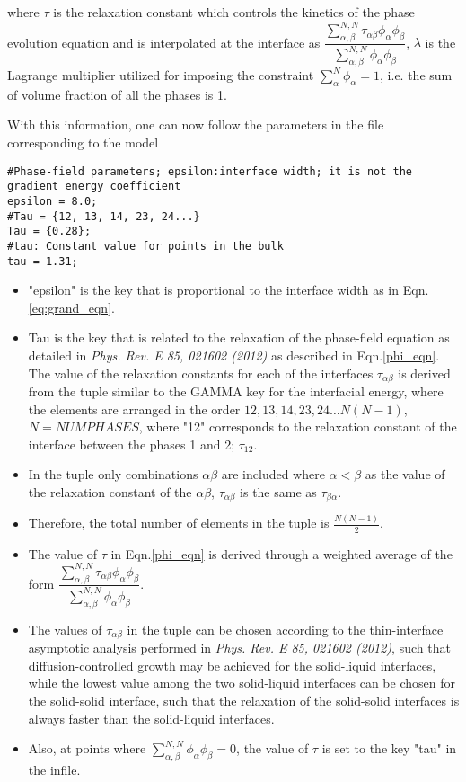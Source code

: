\documentclass[a4paper,10pt]{article}
\begin{document}
where $\tau$ is the relaxation constant which controls the kinetics of the phase 
evolution equation and is interpolated at the interface as $\dfrac{\sum_{\alpha,\beta}^{N,N}\tau_{\alpha\beta}\phi_\alpha\phi_\beta}{\sum_{\alpha,\beta}^{N,N}\phi_\alpha\phi_\beta}$,
$\lambda$ is the Lagrange multiplier 
utilized for imposing the constraint $\sum_{\alpha}^{N} \phi_\alpha = 1$, i.e. the sum of volume fraction of all the phases is 1.


With this information, one can now follow the parameters in the file corresponding to the model

\begin{lstlisting}
#Phase-field parameters; epsilon:interface width; it is not the gradient energy coefficient
epsilon = 8.0;
#Tau = {12, 13, 14, 23, 24...}
Tau = {0.28};
#tau: Constant value for points in the bulk
tau = 1.31;
\end{lstlisting}

\begin{itemize}
 \item "epsilon" is the key that is proportional to the interface width as in Eqn.\ref{eq:grand_eqn}.
 \item Tau is the key that is related to the relaxation of the phase-field equation as detailed in \textit{Phys. Rev. E 85, 021602 (2012)}
 as described in Eqn.\ref{phi_eqn}. The value of the relaxation constants for each of the interfaces $\tau_{\alpha\beta}$ is derived from the 
 tuple similar to the GAMMA key for the interfacial energy, where the elements are arranged in the order ${12,13,14,23,24 \ldots N(N-1)}$, $N=NUMPHASES$,
 where "12" corresponds to the relaxation constant of the interface between the phases 1 and 2; $\tau_{12}$.
 \item In the tuple only combinations $\alpha\beta$ are included where $\alpha<\beta$ as the value of the relaxation constant of the $\alpha\beta$, $\tau_{\alpha\beta}$ 
 is the same as $\tau_{\beta\alpha}$.
 \item Therefore, the total number of elements in the tuple is $\frac{N(N-1)}{2}$.
 \item The value of $\tau$ in Eqn.\ref{phi_eqn} is derived through a weighted average of the form 
 $\dfrac{\sum_{\alpha,\beta}^{N,N}\tau_{\alpha\beta}\phi_\alpha\phi_\beta}{\sum_{\alpha,\beta}^{N,N}\phi_\alpha\phi_\beta}$.
 \item The values of $\tau_{\alpha\beta}$ in the tuple can be chosen according to the thin-interface asymptotic analysis 
performed in \textit{Phys. Rev. E 85, 021602 (2012)}, such that diffusion-controlled growth may be achieved for the solid-liquid interfaces, 
while the lowest value among the two solid-liquid interfaces can be chosen for the solid-solid interface, such that the relaxation of the solid-solid interfaces 
is always faster than the solid-liquid interfaces. 
\item Also, at points where $\sum_{\alpha,\beta}^{N,N}\phi_\alpha\phi_\beta = 0$, the value of $\tau$ is set to the key "tau" in the infile.
\end{itemize}
\end{document}
